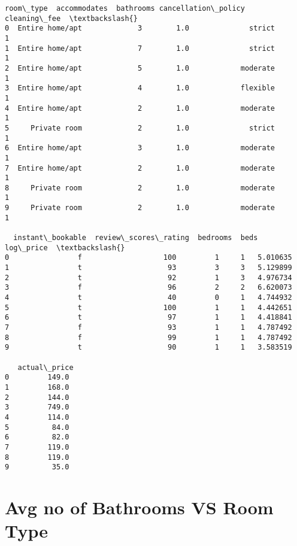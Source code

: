 \documentclass[11pt]{article}
\makeatletter
\newcommand{\boxspacing}{\kern\kvtcb@left@rule\kern\kvtcb@boxsep}
\newcommand{\prompt}[4]{
        {\ttfamily\llap{{\color{#2}[#3]:\hspace{3pt}#4}}\vspace{-\baselineskip}}
    }
\makeatother
\begin{document}
            \begin{tcolorbox}[breakable, size=fbox, boxrule=.5pt, pad at break*=1mm, opacityfill=0]
\prompt{Out}{outcolor}{8}{\boxspacing}
\begin{Verbatim}[commandchars=\\\{\}]
         room\_type  accommodates  bathrooms cancellation\_policy  cleaning\_fee  \textbackslash{}
0  Entire home/apt             3        1.0              strict             1
1  Entire home/apt             7        1.0              strict             1
2  Entire home/apt             5        1.0            moderate             1
3  Entire home/apt             4        1.0            flexible             1
4  Entire home/apt             2        1.0            moderate             1
5     Private room             2        1.0              strict             1
6  Entire home/apt             3        1.0            moderate             1
7  Entire home/apt             2        1.0            moderate             1
8     Private room             2        1.0            moderate             1
9     Private room             2        1.0            moderate             1

  instant\_bookable  review\_scores\_rating  bedrooms  beds  log\_price  \textbackslash{}
0                f                   100         1     1   5.010635
1                t                    93         3     3   5.129899
2                t                    92         1     3   4.976734
3                f                    96         2     2   6.620073
4                t                    40         0     1   4.744932
5                t                   100         1     1   4.442651
6                t                    97         1     1   4.418841
7                f                    93         1     1   4.787492
8                f                    99         1     1   4.787492
9                t                    90         1     1   3.583519

   actual\_price
0         149.0
1         168.0
2         144.0
3         749.0
4         114.0
5          84.0
6          82.0
7         119.0
8         119.0
9          35.0
\end{Verbatim}
\end{tcolorbox}
        
    \section{Avg no of Bathrooms VS Room
Type}\label{avg-no-of-bathrooms-vs-room-type}
\end{document}
